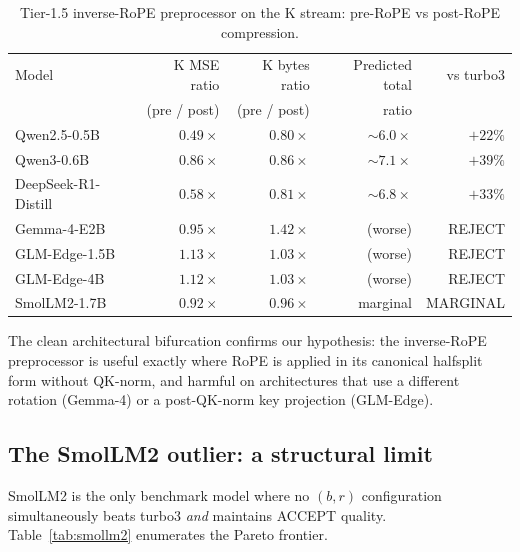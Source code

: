 \documentclass[11pt,a4paper]{article}
\theoremstyle{definition}
\theoremstyle{plain}
\begin{document}
\begin{table}[H]
\centering
\small
\caption{Tier-1.5 inverse-RoPE preprocessor on the K stream: pre-RoPE vs post-RoPE compression.}
\label{tab:rope}
\begin{tabular}{lrrrr}
  \toprule
  Model & K MSE ratio & K bytes ratio & Predicted total & vs turbo3 \\
  & (pre / post) & (pre / post) & ratio & \\
  \midrule
  Qwen2.5-0.5B      & $0.49\times$ & $0.80\times$ & $\sim 6.0\times$ & $+22\%$ \\
  Qwen3-0.6B        & $0.86\times$ & $0.86\times$ & $\sim 7.1\times$ & $+39\%$ \\
  DeepSeek-R1-Distill & $0.58\times$ & $0.81\times$ & $\sim 6.8\times$ & $+33\%$ \\
  \midrule
  Gemma-4-E2B       & $0.95\times$ & $1.42\times$ & (worse)          & REJECT \\
  GLM-Edge-1.5B     & $1.13\times$ & $1.03\times$ & (worse)          & REJECT \\
  GLM-Edge-4B       & $1.12\times$ & $1.03\times$ & (worse)          & REJECT \\
  SmolLM2-1.7B      & $0.92\times$ & $0.96\times$ & marginal         & MARGINAL \\
  \bottomrule
\end{tabular}
\end{table}

The clean architectural bifurcation confirms our hypothesis: the inverse-RoPE preprocessor is useful exactly where RoPE is applied in its canonical halfsplit form without QK-norm, and harmful on architectures that use a different rotation (Gemma-4) or a post-QK-norm key projection (GLM-Edge).

\subsection{The SmolLM2 outlier: a structural limit}
\label{sec:smollm2}

SmolLM2 is the only benchmark model where no $(b, r)$ configuration simultaneously beats turbo3 \emph{and} maintains ACCEPT quality. Table~\ref{tab:smollm2} enumerates the Pareto frontier.
\end{document}
